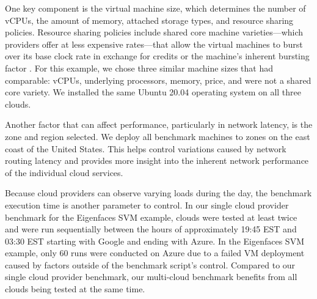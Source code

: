 One key component is the virtual machine size, which determines the
number of vCPUs, the amount of memory, attached storage types, and
resource sharing policies. Resource sharing policies include shared
core machine varieties—which providers offer at less expensive
rates—that allow the virtual machines to burst over its base clock
rate in exchange for credits or the machine's inherent bursting factor
\cite{amazon-instances,google-instances}. For this example, we chose
three similar machine sizes that had comparable: vCPUs, underlying
processors, memory, price, and were not a shared core variety. We
installed the same Ubuntu 20.04 operating system on all three clouds.

Another factor that can affect performance, particularly in network
latency, is the zone and region selected. We deploy all benchmark
machines to zones on the east coast of the United States. This helps
control variations caused by network routing latency and provides more
insight into the inherent network performance of the individual cloud
services.


Because cloud providers can observe varying loads during the day, the
benchmark execution time is another parameter to control. In our
single cloud provider benchmark for the Eigenfaces SVM example, clouds
were tested at least twice and were run sequentially between the hours
of approximately 19:45 EST and 03:30 EST starting with Google and
ending with Azure. In the Eigenfaces SVM example, only 60 runs were
conducted on Azure due to a failed VM deployment caused by factors
outside of the benchmark script's control. Compared to our single
cloud provider benchmark, our multi-cloud benchmark benefits from all
clouds being tested at the same time.

